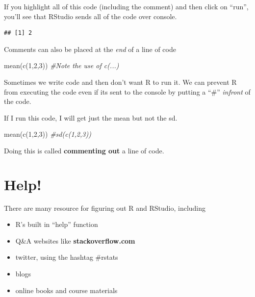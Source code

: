 \documentclass[
]{book}
\newenvironment{Shaded}{\begin{snugshade}}{\end{snugshade}}
\newcommand{\CommentTok}[1]{\textcolor[rgb]{0.56,0.35,0.01}{\textit{#1}}}
\newcommand{\DecValTok}[1]{\textcolor[rgb]{0.00,0.00,0.81}{#1}}
\newcommand{\FunctionTok}[1]{\textcolor[rgb]{0.00,0.00,0.00}{#1}}
\newcommand{\NormalTok}[1]{#1}
\providecommand{\tightlist}{%
  \setlength{\itemsep}{0pt}\setlength{\parskip}{0pt}}
\begin{document}
If you highlight all of this code (including the comment) and then click on ``run'', you'll see that RStudio sends all of the code over console.

\begin{verbatim}
## [1] 2
\end{verbatim}

Comments can also be placed at the \emph{end} of a line of code

\begin{Shaded}
\begin{Highlighting}[]
\FunctionTok{mean}\NormalTok{(}\FunctionTok{c}\NormalTok{(}\DecValTok{1}\NormalTok{,}\DecValTok{2}\NormalTok{,}\DecValTok{3}\NormalTok{)) }\CommentTok{\#Note  the use of c(...)}
\end{Highlighting}
\end{Shaded}

Sometimes we write code and then don't want R to run it. We can prevent R from executing the code even if its sent to the console by putting a ``\#'' \emph{infront} of the code.

If I run this code, I will get just the mean but not the sd.

\begin{Shaded}
\begin{Highlighting}[]
\FunctionTok{mean}\NormalTok{(}\FunctionTok{c}\NormalTok{(}\DecValTok{1}\NormalTok{,}\DecValTok{2}\NormalTok{,}\DecValTok{3}\NormalTok{))}
\CommentTok{\#sd(c(1,2,3))}
\end{Highlighting}
\end{Shaded}

Doing this is called \textbf{commenting out} a line of code.

\hypertarget{help}{%
\section{Help!}\label{help}}

There are many resource for figuring out R and RStudio, including

\begin{itemize}
\tightlist
\item
  R's built in ``help'' function
\item
  Q\&A websites like \textbf{stackoverflow.com}
\item
  twitter, using the hashtag \#rstats
\item
  blogs
\item
  online books and course materials
\end{itemize}
\end{document}
